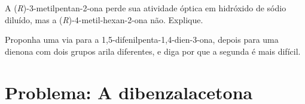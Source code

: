 \begin{exercise}[$\star\star\star$]\label{exo:b2:enolates-aldol:11}
A (\textit{R})-3-metilpentan-2-ona perde sua atividade óptica em hidróxido de sódio diluído, mas a
(\textit{R})-4-metil-hexan-2-ona não. Explique.
\end{exercise}

\begin{exercise}[$\star\star\star$]\label{exo:b2:enolates-aldol:12}
Proponha uma via para a 1,5-difenilpenta-1,4-dien-3-ona, depois para uma dienona com dois grupos
arila diferentes, e diga por que a segunda é mais difícil.
\end{exercise}

\section{Problema: A dibenzalacetona}

